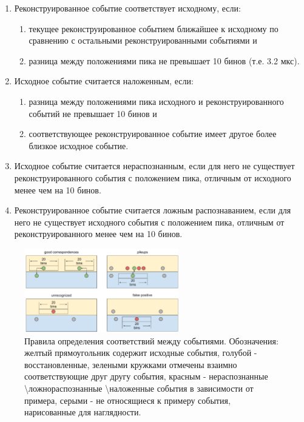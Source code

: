 \documentclass[a4paper,14pt]{extreport}
\begin{document}
\begin{enumerate}
    \item Реконструированное событие соответствует исходному, если:
    \begin{enumerate}
        \item текущее реконструированное событием ближайшее к исходному по сравнению с остальными реконструированными событиями и
        \item разница между положениями пика не превышает 10 бинов (т.е. 3.2 мкс).
    \end{enumerate}
    \item Исходное событие считается наложенным, если:

    \begin{enumerate}
        \item разница между положениями пика исходного и реконструированного событий не превышает 10 бинов и
        \item соответствующее реконструированное событие имеет другое более близкое исходное событие.
    \end{enumerate}
    \item Исходное событие считается нераспознанным, если для него не существует реконструированного события с положением пика, отличным от исходного менее чем на 10 бинов.
    \item Реконструированное событие считается ложным распознаванием, если для него не существует исходного события с положением пика, отличным от реконструированного менее чем на 10 бинов.
\end{enumerate}

\begin{figure}
  \centering
  \includegraphics[width = 0.6\textwidth]{img/signals/compare-scheme.pdf}
  \caption{Правила определения соответствий между событиями. Обозначения: желтый прямоугольник содержит исходные события, голубой - восстановленные, зелеными кружками отмечены взаимно соответствующие друг другу события, красным - нераспознанные \textbackslash ложнораспознанные \textbackslash наложенные события в зависимости от примера, серыми - не относящиеся к примеру события, нарисованные для наглядности.}
  \label{fig:signals-compare-scheme}
\end{figure}
\end{document}
